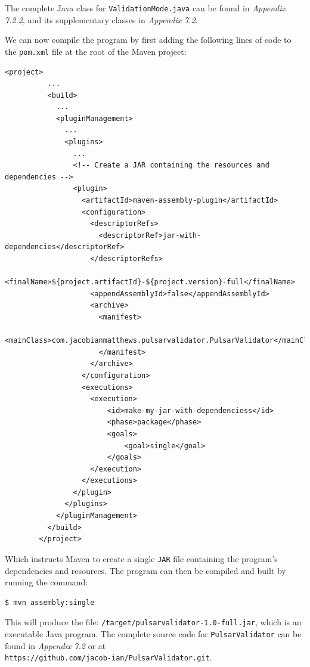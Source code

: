\documentclass{article}
\begin{document}
\begin{appendices}
\begin{subappendices}
        The complete Java class for \verb|ValidationMode.java| can be found in \emph{Appendix 7.2.2}, and its supplementary classes in \emph{Appendix 7.2}.
        
        We can now compile the program by first adding the following lines of code to the \verb|pom.xml| file at the root of the Maven project:
        
        \begin{lstlisting}[numbers=none, title=pom.xml]
        <project>
          ...
          <build>
            ...
            <pluginManagement>
              ...
              <plugins>
                ...
                <!-- Create a JAR containing the resources and dependencies -->
                <plugin>
                  <artifactId>maven-assembly-plugin</artifactId>
                  <configuration>
                    <descriptorRefs>
                      <descriptorRef>jar-with-dependencies</descriptorRef>
                    </descriptorRefs>
                    <finalName>${project.artifactId}-${project.version}-full</finalName>
                    <appendAssemblyId>false</appendAssemblyId>
                    <archive>
                      <manifest>
                        <mainClass>com.jacobianmatthews.pulsarvalidator.PulsarValidator</mainClass>
                      </manifest>
                    </archive>
                  </configuration>
                  <executions>
                    <execution>
                        <id>make-my-jar-with-dependenciess</id>
                        <phase>package</phase>
                        <goals>
                            <goal>single</goal>
                        </goals>
                    </execution>
                  </executions>
                </plugin>
              </plugins>
            </pluginManagement>
          </build>
        </project>
        \end{lstlisting}
        
        Which instructs Maven to create a single \verb|JAR| file containing the program's dependencies and resources. The program can then be compiled and built by running the command:
        
        \begin{lstlisting}[numbers=none]
        $ mvn assembly:single
        \end{lstlisting}
        
        This will produce the file: \verb|/target/pulsarvalidator-1.0-full.jar|, which is an executable Java program. The complete source code for \verb|PulsarValidator| can be found in \emph{Appendix 7.2} or at \\\verb|https://github.com/jacob-ian/PulsarValidator.git|.


\end{subappendices}
\end{appendices}
\end{document}

